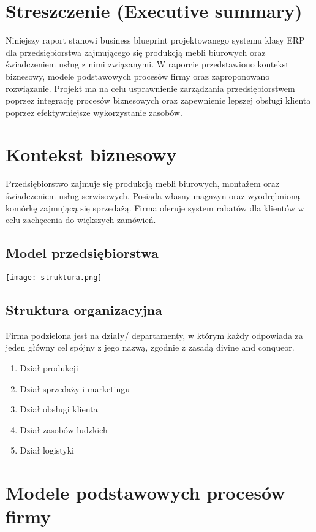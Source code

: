 \section{Streszczenie (Executive summary)}
Niniejszy raport stanowi business blueprint projektowanego systemu
klasy ERP dla przedsiębiorstwa zajmującego się produkcją mebli biurowych
oraz świadczeniem usług z nimi związanymi. W raporcie przedstawiono kontekst
biznesowy, modele podstawowych procesów firmy oraz zaproponowano rozwiązanie.
Projekt ma na celu usprawnienie zarządzania
przedsiębiorstwem poprzez integrację procesów biznesowych oraz zapewnienie lepszej
obsługi klienta poprzez efektywniejsze wykorzystanie zasobów.

\section{Kontekst biznesowy}
Przedsiębiorstwo zajmuje się produkcją mebli biurowych,
montażem oraz świadczeniem usług serwisowych. Posiada własny magazyn
oraz wyodrębnioną komórkę zajmującą się sprzedażą.
Firma oferuje system rabatów dla klientów w celu zachęcenia do większych zamówień.
\subsection{Model przedsiębiorstwa}
\begin{center}
    \texttt{[image: struktura.png]}\\[0.5cm]
\end{center}
\subsection{Struktura organizacyjna}
Firma podzielona jest na działy/ departamenty,
w którym każdy odpowiada za jeden główny cel spójny z jego nazwą,
zgodnie z zasadą divine and conqueor.
\begin{enumerate}
    \item Dział produkcji
    \item Dział sprzedaży i marketingu
    \item Dział obsługi klienta
    \item Dział zasobów ludzkich
    \item Dział logistyki
\end{enumerate}

\section{Modele podstawowych procesów firmy}
